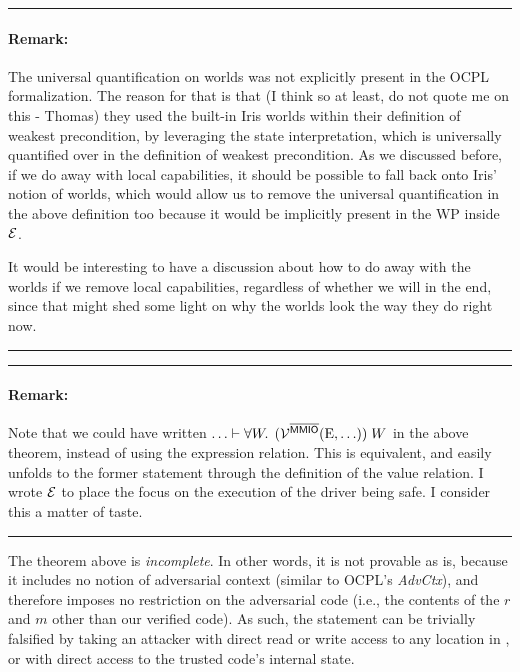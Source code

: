 \documentclass{article}
\newcommand{\X}[1]{\ensuremath{\mathrm{#1}}}
\newcommand{\MMIO}{\textlog{MMIO}\xspace}
\newenvironment{remark}
{ \bigskip\hrule\vspace{-1.3em}\nobreak
  \paragraph*{Remark:}}
{\vspace*{0.5em}\hrule\medskip}
\begin{document}
\begin{remark}
The universal quantification on worlds was not explicitly present in the OCPL
formalization.
The reason for that is that (I think so at least, do not quote me
on this - Thomas) they
used the built-in Iris worlds within their definition of weakest precondition,
by leveraging the state interpretation, which is universally quantified over in
the definition of weakest precondition.
As we discussed before, if we do away
with local capabilities, it should be possible to fall back onto Iris' notion of
worlds, which would allow us to remove the universal quantification in the
above definition too because it would be implicitly present in the WP inside $\mathcal{E}$.

It would be interesting to have a discussion about how to do away with the
worlds if we remove local capabilities, regardless of whether we will in the
end, since that might shed some light on why the worlds look the way they do
right now.
\end{remark}

\begin{remark}
  Note that we could have written
  $\ldots \vdash \forall W \ldotp \; (\VR^{\notMMIO} (\X{E}, \ldots))\; W$ %
  in the above theorem, instead of using the expression relation. This is
  equivalent, and easily unfolds to the former statement through the definition
  of the value relation. I wrote $\mathcal{E}$ to place the focus on the execution of
  the driver being safe. I consider this a matter of taste.
\end{remark}

\medskip

The theorem above is \emph{incomplete}. In other words, it is not provable as
is, because it includes no notion of adversarial context (similar to OCPL's
\textit{AdvCtx}), and therefore imposes no restriction on the adversarial code
(i.e., the contents of the $r$ and $m$ other than our verified code).
%
As such, the statement can be trivially falsified by taking an attacker with
direct read or write access to any location in \MMIO, or with direct access to
the trusted code's internal state.
\end{document}
